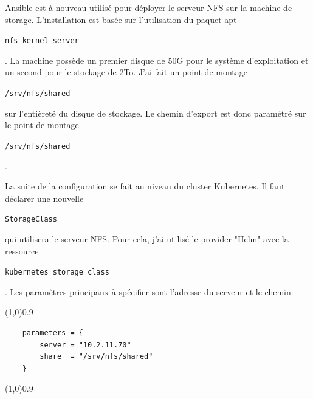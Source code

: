 \documentclass[12pt, a4paper, twoside]{article}
\begin{document}
\gls{Ansible} est à nouveau utilisé pour déployer le serveur NFS sur la machine de storage.
L'installation est basée sur l'utilisation du paquet apt \begin{code}\texttt{nfs-kernel-server}\end{code}.
La machine possède un premier disque de 50G pour le système d'exploitation et un second pour le stockage de 2To.
J'ai fait un point de montage \begin{code}\texttt{/srv/nfs/shared}\end{code} sur l'entièreté du disque de stockage.
Le chemin d'export est donc paramétré sur le point de montage \begin{code}\texttt{/srv/nfs/shared}\end{code}.

La suite de la configuration se fait au niveau du \gls{cluster} \gls{Kubernetes}.
Il faut déclarer une nouvelle \begin{code}\texttt{StorageClass}\end{code} qui utilisera le serveur NFS.
Pour cela, j'ai utilisé le provider "Helm" avec la ressource \begin{code}\texttt{kubernetes\_storage\_class}\end{code}.
Les paramètres principaux à spécifier sont l'adresse du serveur et le chemin:
\vspace{-1ex}
\begin{code}
\vspace{-1ex}
\begin{center} 
    \line(1,0){0.9\textwidth} 
\end{center}
\vspace{-1ex}
\begin{verbatim}
    parameters = {
        server = "10.2.11.70"
        share  = "/srv/nfs/shared"
    }
\end{verbatim}
\vspace{-1ex}
\begin{center} 
    \line(1,0){0.9\textwidth} 
\end{center}
\vspace{-1ex}
\end{code}
\end{document}
